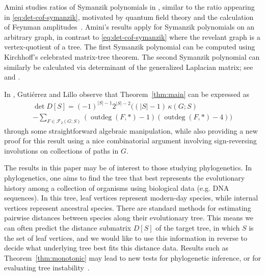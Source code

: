 \documentclass[12pt]{amsart}
\theoremstyle{definition}
\newcommand{\forests}{\mathcal{F}}
\DeclareMathOperator{\outdeg}{outdeg}
\newcommand\farbod[1]{\footnote{[\textcolor{orange}{(Farbod)} \textcolor{blue}{#1}]}}
\begin{document}

Amini studies ratios of Symanzik polynomials in \cite{amini}, similar to the ratio appearing in \eqref{eq:det-cof-symanzik}, motivated by quantum field theory and the calculation of Feynman amplitudes~\cite{amini-bloch-etal}.
Amini's results apply for Symanzik polynomials on an arbitrary graph, in contrast to \eqref{eq:det-cof-symanzik} where the revelant graph is a vertex-quotient of a tree.
The first Symanzik polynomial can be computed using Kirchhoff's celebrated matrix-tree theorem.
The second Symanzik polynomial can similarly be calculated via determinant of the generalized Laplacian matrix; see 
\cite[Section 1.1]{amini} and \cite[Theorem 7.1]{brown}.

In \cite{gutierrez-lillo}, Guti\'{e}rrez and Lillo observe that Theorem~\ref{thm:main} can be expressed as
\begin{multline}
	\det D[S] = (-1)^{|S| - 1} 2^{|S| - 2} \Big( (|S| - 1)\, \kappa(G;S)  \\
	- \!\!\! \sum_{F \in \forests_2(G;S)} \left(\outdeg(F,*) - 1\right)\left(\outdeg(F,*) - 4\right)  \Big)
\end{multline}
through some straightforward algebraic manipulation,
while also providing a new proof for this result using a nice combinatorial argument involving sign-reversing involutions on collections of paths in $G$.

The results in this paper may be of interest to those studying phylogenetics.
In phylogenetics, one aims to find the tree that best represents the evolutionary history among a collection of organisms using biological data (e.g. DNA sequences).
In this tree, leaf vertices represent modern-day species, while internal vertices represent ancestral species.
There are standard methods for estimating pairwise distances between species along their evolutionary tree. 
This means we can often predict the distance submatrix $D[S]$ of the target tree, in which $S$ is the set of leaf vertices, and we would like to use this information in reverse to decide what underlying tree best fits this distance data.
Results such as Theorem~\ref{thm:monotonic} may lead to new tests for phylogenetic inference, or for evaluating tree instability~\cite{collienne-etal}.
\end{document}
